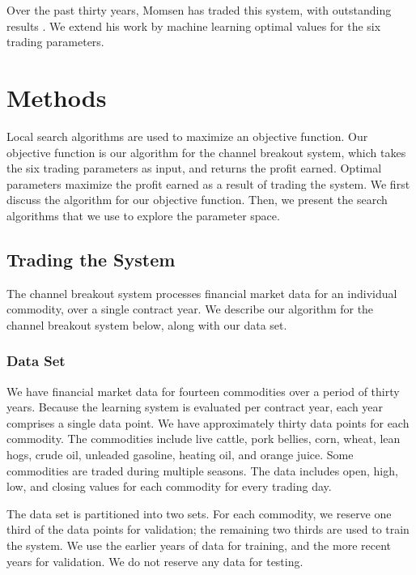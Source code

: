 \documentclass[12pt]{article}
\begin{document}
Over the past thirty years, Momsen has traded this system, with outstanding
results \cite{Momsen}.  We extend his work by machine learning optimal values for the six
trading parameters.

\section{Methods}

Local search algorithms are used to maximize an objective function. Our
objective function is our algorithm for the channel breakout system, which
takes the six trading parameters as input, and returns the profit
earned. Optimal parameters maximize the profit earned as a result of trading the
system. We first discuss the algorithm for our objective function. Then, we
present the search algorithms that we use to explore the parameter space.

\subsection{Trading the System}

The channel breakout system processes financial market data for an individual
commodity, over a single contract year.  We describe our algorithm for the
channel breakout system below, along with our data set.

\vspace{25pt}
\subsubsection{Data Set}

We have financial market data for fourteen commodities over a period of thirty
years.  Because the learning system is evaluated per contract year, each year
comprises a single data point.  We have approximately thirty data points for
each commodity.  The commodities include live cattle, pork bellies, corn,
wheat, lean hogs, crude oil, unleaded gasoline, heating oil, and orange juice.
Some commodities are traded during multiple seasons.  The data includes open,
high, low, and closing values for each commodity for every trading day.

The data set is partitioned into two sets. For each commodity, we reserve one
third of the data points for validation; the remaining two thirds are used to train
the system. We use the earlier years of data for training, and the more recent
years for validation. We do not reserve any data for testing.
\end{document}
